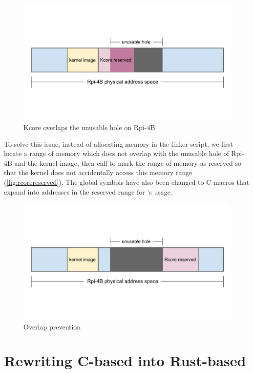 \begin{figure}[hbtp]
    \includegraphics[scale=0.60]{figures/overlap.pdf}
    \caption{Kcore overlaps the unusable hole on Rpi-4B}
    \label{fig:overlap}
\end{figure}

To solve this issue, instead of allocating memory in the linker script,
we first locate a range of memory which does not overlap with the unusable hole
of Rpi-4B and the kernel image, then call  to
mark the range of memory as reserved so that the kernel does not accidentally
access this memory range (\autoref{fig:rcorereserved}).
The global symbols have also been changed to C macros that expand into
addresses in the reserved range for \rustsec{}'s \rustcore{} usage.

\begin{figure}[H]
    \includegraphics[scale=0.60]{figures/rcore_reserved.pdf}
    \caption{Overlap prevention}
    \label{fig:rcorereserved}
\end{figure}

\section{Rewriting C-based \secore{} into Rust-based \rustcore{}}

